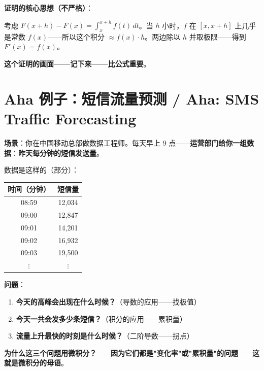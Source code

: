 \textbf{证明的核心思想（不严格）}：

考虑 $F(x+h) - F(x) = \int_x^{x+h} f(t) \, dt$。当 $h$ 小时，$f$ 在 $[x, x+h]$ 上几乎是常数 $f(x)$——所以这个积分 $\approx f(x) \cdot h$。两边除以 $h$ 并取极限——得到 $F'(x) = f(x)$。

\textbf{这个证明的画面——记下来——比公式重要}。

\section{Aha 例子：短信流量预测 / Aha: SMS Traffic Forecasting}

\textbf{场景}：你在中国移动总部做数据工程师。每天早上 9 点——\textbf{运营部门给你一组数据}：\textbf{昨天每分钟的短信发送量}。

数据是这样的（部分）：

\begin{center}
\begin{tabular}{cc}
\toprule
时间（分钟） & 短信量 \\
\midrule
08:59 & 12,034 \\
09:00 & 12,847 \\
09:01 & 14,201 \\
09:02 & 16,932 \\
09:03 & 19,500 \\
$\vdots$ & $\vdots$ \\
\bottomrule
\end{tabular}
\end{center}

\textbf{问题}：

\begin{enumerate}
\item \textbf{今天的高峰会出现在什么时候？}（导数的应用——找极值）
\item \textbf{今天一共会发多少条短信？}（积分的应用——累积量）
\item \textbf{流量上升最快的时刻是什么时候？}（二阶导数——拐点）
\end{enumerate}

\textbf{为什么这三个问题用微积分？}——\textbf{因为它们都是"变化率"或"累积量"的问题}——\textbf{这就是微积分的母语}。

